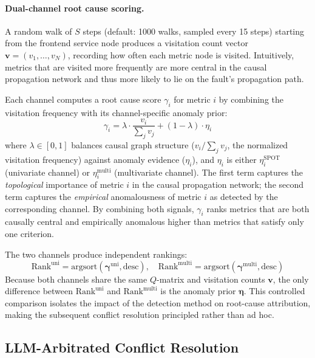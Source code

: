\documentclass[a4paper,fleqn]{cas-dc}
\begin{document}
\paragraph{Dual-channel root cause scoring.}
A random walk of $S$ steps (default: 1000 walks, sampled every 15 steps) starting from the frontend service node produces a visitation count vector $\mathbf{v} = (v_1, \ldots, v_N)$, recording how often each metric node is visited.  Intuitively, metrics that are visited more frequently are more central in the causal propagation network and thus more likely to lie on the fault's propagation path.

Each channel computes a root cause score $\gamma_i$ for metric $i$ by combining the visitation frequency with its channel-specific anomaly prior:
\begin{equation}
  \gamma_i = \lambda \cdot \frac{v_i}{\sum_j v_j} + (1 - \lambda) \cdot \eta_i
  \label{eq:gamma}
\end{equation}
where $\lambda \in [0,1]$ balances causal graph structure ($v_i / \sum_j v_j$, the normalized visitation frequency) against anomaly evidence ($\eta_i$), and $\eta_i$ is either $\eta^{\text{SPOT}}_i$ (univariate channel) or $\eta^{\text{multi}}_i$ (multivariate channel).  The first term captures the \emph{topological} importance of metric $i$ in the causal propagation network; the second term captures the \emph{empirical} anomalousness of metric $i$ as detected by the corresponding channel.  By combining both signals, $\gamma_i$ ranks metrics that are both causally central and empirically anomalous higher than metrics that satisfy only one criterion.

The two channels produce independent rankings:
\begin{equation}
  \text{Rank}^{\text{uni}} = \text{argsort}(\boldsymbol{\gamma}^{\text{uni}}, \text{desc}), \quad
  \text{Rank}^{\text{multi}} = \text{argsort}(\boldsymbol{\gamma}^{\text{multi}}, \text{desc})
  \label{eq:ranking}
\end{equation}
Because both channels share the same $Q$-matrix and visitation counts $\mathbf{v}$, the only difference between $\text{Rank}^{\text{uni}}$ and $\text{Rank}^{\text{multi}}$ is the anomaly prior $\boldsymbol{\eta}$.  This controlled comparison isolates the impact of the detection method on root-cause attribution, making the subsequent conflict resolution principled rather than ad hoc.


\subsection{LLM-Arbitrated Conflict Resolution}
\label{sec:conflict}
\end{document}
